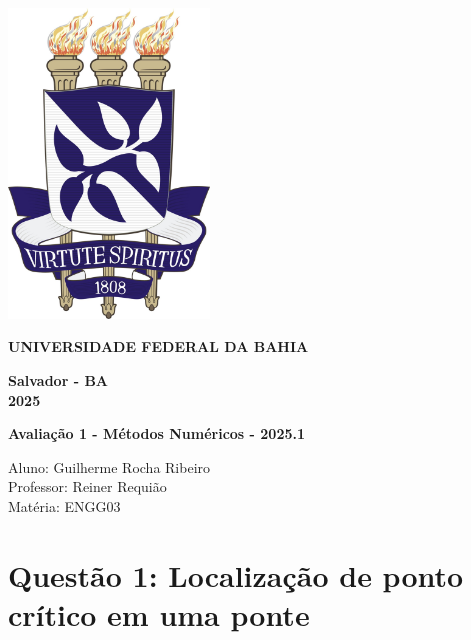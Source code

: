 \documentclass{article}
\begin{document}
\begin{titlepage}
    \centering
    
    \includegraphics[width=0.4\textwidth]{brasao_ufba.jpg} \\
    \vspace{1cm}
    
    \textbf{\large UNIVERSIDADE FEDERAL DA BAHIA} \\
    \vspace{12cm}
    
    \textbf{\large Salvador - BA} \\
    \textbf{\large 2025}
\end{titlepage}




\begin{center}
\large\textbf{Avaliação 1 - Métodos Numéricos - 2025.1} \\
\end{center}

\begin{flushleft}
Aluno: Guilherme Rocha Ribeiro \\
Professor: Reiner Requião \\
Matéria: ENGG03
\end{flushleft}

\section*{Questão 1: Localização de ponto crítico em uma ponte}
\justifying
\end{document}
